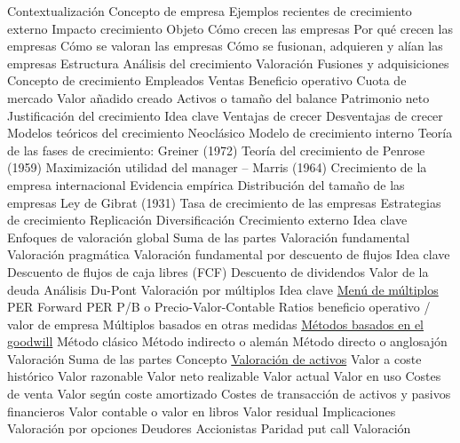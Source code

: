 \documentclass{nuevotema}
\begin{document}
\begin{esquema}[enumerate]
	\1[] 
		\2 Contextualización
			\3 Concepto de empresa
			\3 Ejemplos recientes de crecimiento externo
			\3 Impacto crecimiento
		\2 Objeto
			\3 Cómo crecen las empresas
			\3 Por qué crecen las empresas
			\3 Cómo se valoran las empresas
			\3 Cómo se fusionan, adquieren y alían las empresas
		\2 Estructura
			\3 Análisis del crecimiento
			\3 Valoración
			\3 Fusiones y adquisiciones
	\1
		\2 Concepto de crecimiento
			\3 Empleados
			\3 Ventas
			\3 Beneficio operativo
			\3 Cuota de mercado
			\3 Valor añadido creado
			\3 Activos o tamaño del balance
			\3 Patrimonio neto
		\2 Justificación del crecimiento
			\3 Idea clave
			\3 Ventajas de crecer
			\3 Desventajas de crecer
		\2 Modelos teóricos del crecimiento
			\3 Neoclásico
			\3 Modelo de crecimiento interno
			\3 Teoría de las fases de crecimiento: Greiner (1972)
			\3 Teoría del crecimiento de Penrose (1959)
			\3 Maximización utilidad del manager -- Marris (1964)
			\3 Crecimiento de la empresa internacional
		\2 Evidencia empírica
			\3 Distribución del tamaño de las empresas
			\3 Ley de Gibrat (1931)
			\3 Tasa de crecimiento de las empresas
		\2 Estrategias de crecimiento
			\3 Replicación
			\3 Diversificación
			\3 Crecimiento externo
	\1 
		\2 Idea clave
			\3 Enfoques de valoración global
			\3 Suma de las partes
			\3 Valoración fundamental
			\3 Valoración pragmática
		\2 Valoración fundamental por descuento de flujos
			\3 Idea clave
			\3 Descuento de flujos de caja libres (FCF)
			\3 Descuento de dividendos
			\3 Valor de la deuda
			\3 Análisis Du-Pont
		\2 Valoración por múltiplos
			\3 Idea clave
			\3 \underline{Menú de múltiplos}
			\3 PER
			\3 Forward PER
			\3 P/B o Precio-Valor-Contable
			\3 Ratios beneficio operativo / valor de empresa
			\3 Múltiplos basados en otras medidas
			\3 \underline{Métodos basados en el goodwill}
			\3 Método clásico
			\3 Método indirecto o alemán
			\3 Método directo o anglosajón
			\3 Valoración
		\2 Suma de las partes
			\3 Concepto
			\3 \underline{Valoración de activos}
			\3 Valor a coste histórico
			\3 Valor razonable
			\3 Valor neto realizable
			\3 Valor actual
			\3 Valor en uso
			\3 Costes de venta
			\3 Valor según coste amortizado
			\3 Costes de transacción de activos y pasivos financieros
			\3 Valor contable o valor en libros
			\3 Valor residual
			\3 Implicaciones
		\2 Valoración por opciones
			\3 Deudores
			\3 Accionistas
			\3 Paridad put call
			\3 Valoración

\end{esquema}
\end{document}
